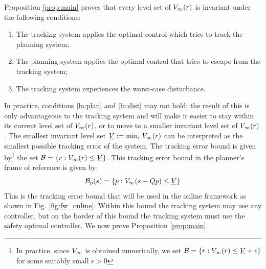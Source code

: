 Proposition \ref{prop:main} proves that every level set of $V_\infty(r)$ is invariant under the following conditions:
\begin{enumerate}
  \item The tracking system applies the optimal control which tries to track the planning system;
  \item The planning system applies the optimal control that tries to escape from the tracking system; \label{ln:plan}
  \item The tracking system experiences the worst-case disturbance. \label{ln:dist}
\end{enumerate}
In practice, conditions \ref{ln:plan} and \ref{ln:dist} may not hold; the result of this is only advantageous to the tracking system and will make it easier to stay within its current level set of $V_\infty(r)$, or to move to a smaller invariant level set of $V_\infty(r)$. The smallest invariant level set $\underline{V} := \min_{r} V_\infty(r)$ can be interpreted as the smallest possible tracking error of the system. The tracking error bound is given by\footnote{In practice, since $V_\infty$ is obtained numerically, we set $\mathcal B = \{r: V_\infty(r) \le \underline{V} + \epsilon\}$ for some suitably small $\epsilon>0$} the set $\mathcal B = \{r: V_\infty(r) \le \underline{V}\}$. This tracking error bound in the planner's frame of reference is given by:
\begin{equation} \label{eq:TEBp}
\mathcal B_p(s) = \{p: V_\infty(s-Qp) \le \underline{V}\}
\end{equation}
This is the tracking error bound that will be used in the online framework as shown in Fig. \ref{fig:fw_online}. Within this bound the tracking system may use any controller, but on the border of this bound the tracking system must use the safety optimal controller. We now prove Proposition \ref{prop:main}.

